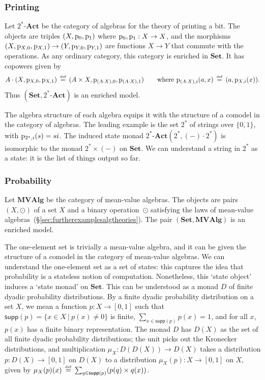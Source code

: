 \documentclass{LMCS}
\newcommand{\ltensor}[2]{#1 \cdot #2}
\newcommand{\Set}{\mathbf{Set}}
\newcommand{\defeq}{\mathrel{\,\stackrel{\mbox{\tiny{$\mathrm{def}$}}}=\,}}
\begin{document}
\subsubsection{Printing}
\newcommand{\TwoStarAct}{\textbf{$2^*$-Act}}
Let $\TwoStarAct$ be the category
of algebras for 
the theory of printing a bit.
The objects are triples $(X,\mathrm{p}_{0},\mathrm{p}_{1})$ 
where $\mathrm{p}_{0},\mathrm{p}_{1}: X\to X$,
and the morphisms $(X,\mathrm{p}_{X,0},\mathrm{p}_{X,1})\to (Y,\mathrm{p}_{Y,0},\mathrm{p}_{Y,1})$
are functions $X\to Y$ that commute with the operations.
As any ordinary category, this category is enriched in $\Set$.
It has copowers given by 
\[
\ltensor A(X,\oprint {X,0},\oprint{X,1})
\defeq
(A \times X,\oprint {(\ltensor AX),0},\oprint{(\ltensor A X),1})
\qquad\text{where\ }
\oprint{(\ltensor AX),i}(a,x)
\defeq (a,\oprint {X,i}(x))\text.\]
Thus $(\Set,\TwoStarAct)$ is an enriched model.

The algebra structure of each algebra 
equips it with the structure of a comodel
in the category of algebras.
The leading example
is the set $2^*$ of strings over $\{0,1\}$, 
with $\mathrm{p}_{2^*,i}(s)=si$.
The induced state monad $\TwoStarAct(2^*,\ltensor{(-)}2^*)$ 
is isomorphic to the monad
$2^*\times(-)$ on $\Set$.
We can understand a string in $2^*$ as a state: it is the 
list of things output so far.

\subsubsection{Probability}
\newcommand{\MeanValueAlgebras}{\textbf{MVAlg}}
Let $\MeanValueAlgebras$ be the category
of mean-value algebras.
The objects are pairs $(X,\odot)$ 
of a set $X$ and a binary operation~$\odot$ 
satisfying the laws of mean-value algebras~(\S\ref{sec:furtherexamplesalgtheories}).
The pair $(\Set,\MeanValueAlgebras)$ is an enriched model.

The one-element set is trivially a mean-value algebra,
and it can be given the structure of a comodel in the category of 
mean-value algebras.
We can understand the one-element set as a set of states:
this captures the idea that probability is a stateless notion of computation.
Nonetheless, this `state object' induces a `state monad' on $\Set$.
This can be understood as a monad $D$ of 
finite dyadic probability 
distributions.
By a finite dyadic probability distribution 
on a set $X$, 
we mean a function $p:X\to[0,1]$ 
such that 
$\mathsf{supp}(p)=
\{x\in X~|~p(x)\neq 0\}$ is finite,
$\sum_{x\in\mathsf{supp}(p)}p(x)=1$,
and for all $x$, $p(x)$ has a finite binary representation.
The monad $D$ has 
$D(X)$ as the set of all finite dyadic probability distributions;
the unit picks out the Kronecker distributions,
and multiplication 
$\mu_X:D(D(X))\to D(X)$ 
takes a distribution $p:D(X)\to [0,1]$ on $D(X)$ 
to a distribution $\mu_X(p):X\to[0,1]$ on $X$,
given by $\mu_X(p)(x)\defeq\sum_{q\in \mathsf{supp}(p)}( p(q)\times q(x))$.
\end{document}

